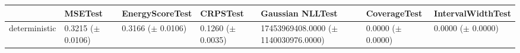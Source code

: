 \begin{tabular}{lllllll}
\toprule
 & MSETest & EnergyScoreTest & CRPSTest & Gaussian NLLTest & CoverageTest & IntervalWidthTest \\
\midrule
deterministic & \makecell{0.3215 \\ ($\pm$ 0.0106)} & \makecell{0.3166 \\ ($\pm$ 0.0106)} & \makecell{0.1260 \\ ($\pm$ 0.0035)} & \makecell{17453969408.0000 \\ ($\pm$ 1140030976.0000)} & \makecell{0.0000 \\ ($\pm$ 0.0000)} & \makecell{0.0000 \\ ($\pm$ 0.0000)} \\
\bottomrule
\end{tabular}
